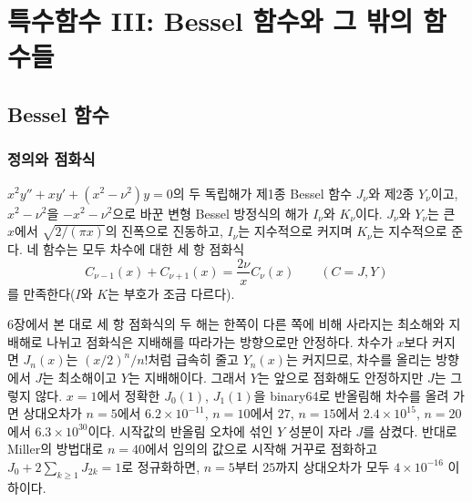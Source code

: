 \chapter{특수함수 III: Bessel 함수와 그 밖의 함수들}
\label{ch:special-3}


\section{Bessel 함수}
\label{sec:bessel}

\subsection{정의와 점화식}

 $x^2y''+xy'+(x^2-\nu^2)y=0$의 두 독립해가 제1종 Bessel 함수 $J_\nu$와 제2종 $Y_\nu$이고, $x^2-\nu^2$을 $-x^2-\nu^2$으로 바꾼 변형 Bessel 방정식의 해가 $I_\nu$와 $K_\nu$이다\cite{watson1944bessel}. $J_\nu$와 $Y_\nu$는 큰 $x$에서 $\sqrt{2/(\pi x)}$의 진폭으로 진동하고, $I_\nu$는 지수적으로 커지며 $K_\nu$는 지수적으로 준다. 네 함수는 모두 차수에 대한 세 항 점화식
\[
C_{\nu-1}(x)+C_{\nu+1}(x)=\frac{2\nu}xC_\nu(x)\qquad(C=J,Y)
\]
를 만족한다($I$와 $K$는 부호가 조금 다르다).

6장에서 본 대로 세 항 점화식의 두 해는 한쪽이 다른 쪽에 비해 사라지는 최소해와 지배해로 나뉘고 점화식은 지배해를 따라가는 방향으로만 안정하다\cite{gautschi1967recurrence}. 차수가 $x$보다 커지면 $J_n(x)$는 $(x/2)^n/n!$처럼 급속히 줄고 $Y_n(x)$는 커지므로, 차수를 올리는 방향에서 $J$는 최소해이고 $Y$는 지배해이다. 그래서 $Y$는 앞으로 점화해도 안정하지만 $J$는 그렇지 않다. $x=1$에서 정확한 $J_0(1)$, $J_1(1)$을 binary64로 반올림해 차수를 올려 가면 상대오차가 $n=5$에서 $6.2\times10^{-11}$, $n=10$에서 $27$, $n=15$에서 $2.4\times10^{15}$, $n=20$에서 $6.3\times10^{30}$이다. 시작값의 반올림 오차에 섞인 $Y$ 성분이 자라 $J$를 삼켰다. 반대로 Miller의 방법대로 $n=40$에서 임의의 값으로 시작해 거꾸로 점화하고 $J_0+2\sum_{k\ge1}J_{2k}=1$로 정규화하면, $n=5$부터 $25$까지 상대오차가 모두 $4\times10^{-16}$ 이하이다.

